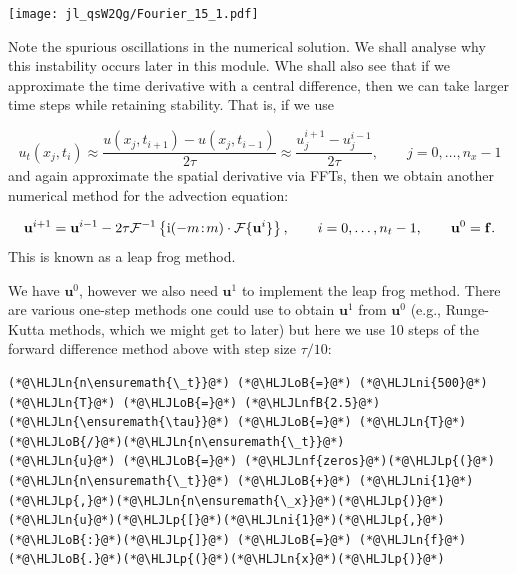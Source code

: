 \documentclass[12pt,landscape]{article}
\newcommand{\HLJLn}[1]{#1}
\newcommand{\HLJLnf}[1]{\textcolor[RGB]{66,102,213}{#1}}
\newcommand{\HLJLnfB}[1]{\textcolor[RGB]{59,151,46}{#1}}
\newcommand{\HLJLni}[1]{\textcolor[RGB]{59,151,46}{#1}}
\newcommand{\HLJLoB}[1]{\textcolor[RGB]{102,102,102}{\textbf{#1}}}
\newcommand{\HLJLp}[1]{#1}
\begin{document}
{\texttt{[image: jl\_qsW2Qg/Fourier\_15\_1.pdf]}

Note the spurious oscillations in the numerical solution.  We shall analyse why this instability occurs later in this module.  Whe shall also see that if we approximate the time derivative with a central difference, then we can take larger time steps while retaining stability. That is, if we use

\[
u_t(x_j,t_i) \approx \frac{u(x_j,t_{i+1}) - u(x_j,t_{i-1})}{2\tau} \approx \frac{u^{i+1}_j - u^{i-1}_j}{2\tau}, \qquad j = 0, \ldots, n_x-1
\]
and again approximate the spatial derivative via FFTs, then we obtain another numerical method for the advection equation:

\[
\mathbf{u}^{i+1} = \mathbf{u}^{i-1} - 2\tau \mathcal{F}^{-1}\left\lbrace {\rm i}(-m\!:\!m)\cdot\mathcal{F}\lbrace \mathbf{u}^{i} \rbrace\right\rbrace, \qquad i = 0, \ldots, n_t-1, \qquad \mathbf{u}^0 = \mathbf{f}.
\]
This is known as a leap frog method.

We have $\mathbf{u}^0$, however we also need $\mathbf{u}^1$ to implement the leap frog method.  There are various one-step methods one could use to obtain $\mathbf{u}^1$ from $\mathbf{u}^0$ (e.g., Runge-Kutta methods, which we might get to later) but here we use 10 steps of the forward difference method above with step size $\tau/10$:


\begin{lstlisting}
(*@\HLJLn{n\ensuremath{\_t}}@*) (*@\HLJLoB{=}@*) (*@\HLJLni{500}@*)
(*@\HLJLn{T}@*) (*@\HLJLoB{=}@*) (*@\HLJLnfB{2.5}@*)
(*@\HLJLn{\ensuremath{\tau}}@*) (*@\HLJLoB{=}@*) (*@\HLJLn{T}@*)(*@\HLJLoB{/}@*)(*@\HLJLn{n\ensuremath{\_t}}@*)
(*@\HLJLn{u}@*) (*@\HLJLoB{=}@*) (*@\HLJLnf{zeros}@*)(*@\HLJLp{(}@*)(*@\HLJLn{n\ensuremath{\_t}}@*) (*@\HLJLoB{+}@*) (*@\HLJLni{1}@*)(*@\HLJLp{,}@*)(*@\HLJLn{n\ensuremath{\_x}}@*)(*@\HLJLp{)}@*)
(*@\HLJLn{u}@*)(*@\HLJLp{[}@*)(*@\HLJLni{1}@*)(*@\HLJLp{,}@*)(*@\HLJLoB{:}@*)(*@\HLJLp{]}@*) (*@\HLJLoB{=}@*) (*@\HLJLn{f}@*)(*@\HLJLoB{.}@*)(*@\HLJLp{(}@*)(*@\HLJLn{x}@*)(*@\HLJLp{)}@*) 


\end{lstlisting}}
\end{document}
